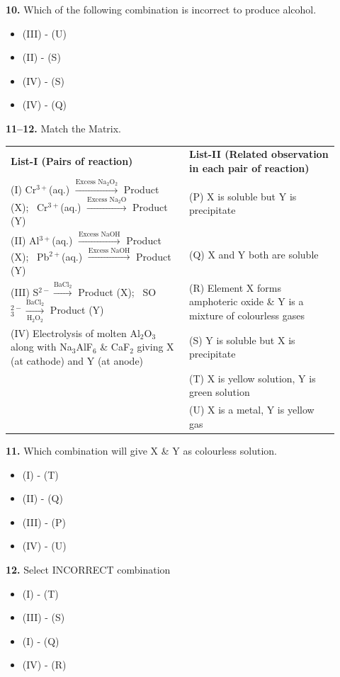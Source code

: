 \documentclass[10pt,twocolumn]{extarticle}
\renewcommand{\arraystretch}{1.15}
\newenvironment{qoptions}{\begin{itemize}[leftmargin=1.8em,itemsep=2pt,topsep=2pt,label={}]}{\end{itemize}}
\newcommand{\opt}[2]{\item[({#1})] {#2}}
\begin{document}
\textbf{10.} Which of the following combination is incorrect to produce alcohol.

\begin{qoptions}
\opt{A}{(III) - (U)}
\opt{B}{(II) - (S)}
\opt{C}{(IV) - (S)}
\opt{D}{(IV) - (Q)}
\end{qoptions}

\textbf{11--12.} Match the Matrix.

\begin{center}
\renewcommand{\arraystretch}{1.4}
\begin{tabular}{@{}p{0.5\linewidth}p{0.42\linewidth}@{}}
\textbf{List-I (Pairs of reaction)} & \textbf{List-II (Related observation in each pair of reaction)}\\
(I) Cr$^{3+}$(aq.) $\xrightarrow{\text{Excess Na}_2\text{O}_2}$ Product (X); \ Cr$^{3+}$(aq.) $\xrightarrow{\text{Excess Na}_2\text{O}}$ Product (Y) & (P) X is soluble but Y is precipitate\\
(II) Al$^{3+}$(aq.) $\xrightarrow{\text{Excess NaOH}}$ Product (X); \ Pb$^{2+}$(aq.) $\xrightarrow{\text{Excess NaOH}}$ Product (Y) & (Q) X and Y both are soluble\\
(III) S$^{2-}\xrightarrow{\text{BaCl}_2}$ Product (X); \ SO$_3^{2-}\xrightarrow[\text{H}_2\text{O}_2]{\text{BaCl}_2}$ Product (Y) & (R) Element X forms amphoteric oxide \& Y is a mixture of colourless gases\\
(IV) Electrolysis of molten Al$_2$O$_3$ along with Na$_3$AlF$_6$ \& CaF$_2$ giving X (at cathode) and Y (at anode) & (S) Y is soluble but X is precipitate\\
 & (T) X is yellow solution, Y is green solution\\
 & (U) X is a metal, Y is yellow gas\\
\end{tabular}
\renewcommand{\arraystretch}{1.15}
\end{center}

\textbf{11.} Which combination will give X \& Y as colourless solution.

\begin{qoptions}
\opt{A}{(I) - (T)}
\opt{B}{(II) - (Q)}
\opt{C}{(III) - (P)}
\opt{D}{(IV) - (U)}
\end{qoptions}

\textbf{12.} Select INCORRECT combination

\begin{qoptions}
\opt{A}{(I) - (T)}
\opt{B}{(III) - (S)}
\opt{C}{(I) - (Q)}
\opt{D}{(IV) - (R)}
\end{qoptions}
\end{document}
